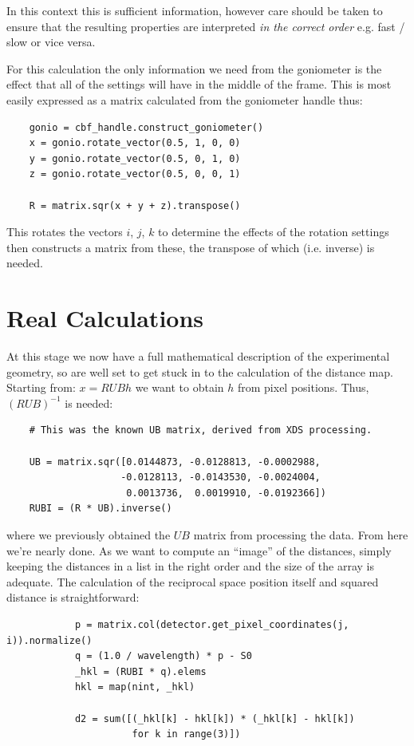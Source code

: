 \documentclass[a4paper, 11pt]{article}
\begin{document}
\noindent
In this context this is sufficient information, however care should be taken to ensure that the resulting properties are interpreted \emph{in the correct order} e.g. fast / slow or vice versa.

For this calculation the only information we need from the goniometer is the effect that all of the settings will have in the middle of the frame. This is most easily expressed as a matrix calculated from the goniometer handle thus:

{\small
\begin{verbatim}
    gonio = cbf_handle.construct_goniometer()
    x = gonio.rotate_vector(0.5, 1, 0, 0)
    y = gonio.rotate_vector(0.5, 0, 1, 0)
    z = gonio.rotate_vector(0.5, 0, 0, 1)

    R = matrix.sqr(x + y + z).transpose()
\end{verbatim}
}

\noindent
This rotates the vectors $i$, $j$, $k$ to determine the effects of the rotation settings then constructs a matrix from these, the transpose of which (i.e. inverse) is needed.

\section{Real Calculations}

At this stage we now have a full mathematical description of the experimental geometry, so are well set to get stuck in to the calculation of the distance map. Starting from: $x = R U B h$ we want to obtain $h$ from pixel positions. Thus, $(R U B)^{-1}$ is needed:

{\small
\begin{verbatim}
    # This was the known UB matrix, derived from XDS processing.

    UB = matrix.sqr([0.0144873, -0.0128813, -0.0002988,
                    -0.0128113, -0.0143530, -0.0024004,
                     0.0013736,  0.0019910, -0.0192366])
    RUBI = (R * UB).inverse()
\end{verbatim}
}

\noindent
where we previously obtained the $U B$ matrix from processing the data. From here we're nearly done. As we want to compute an ``image'' of the distances, simply keeping the distances in a list in the right order and the size of the array is adequate. The calculation of the reciprocal space position itself and squared distance is straightforward:

{\small
\begin{verbatim}
            p = matrix.col(detector.get_pixel_coordinates(j, i)).normalize()
            q = (1.0 / wavelength) * p - S0
            _hkl = (RUBI * q).elems
            hkl = map(nint, _hkl)

            d2 = sum([(_hkl[k] - hkl[k]) * (_hkl[k] - hkl[k])
                      for k in range(3)])
\end{verbatim}
}
\end{document}
